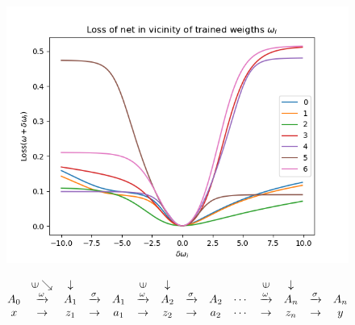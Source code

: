 \documentclass[12pt,a4paper]{article}
\newcommand{\vin}{\rotatebox[origin=c]{90}{$\in$}}
\begin{document}
\begin{figure}[H]
\center
\includegraphics[scale=0.5]{Images/LossInVicinityOfTrainedWeights.png}
\caption{}
\label{LossNearTrainedWeights}
\end{figure}

\newpage

\begin{equation}
\begin{array}{cccccccccccccc}
&
\vin\searrow & \downarrow &  &  & \vin 
 & \downarrow  &  &  &
 &
\vin & \downarrow &  &  \\

A_0 &
\xrightarrow{\omega} & A_1 & \xrightarrow{\sigma} & A_1 & 
\xrightarrow{\omega} & A_2 & \xrightarrow{\sigma} & A_2 &
\cdots &
\xrightarrow{\omega} & A_n & \xrightarrow{\sigma} & A_n \\

x &
\rightarrow & z_1 & \rightarrow & a_1 & 
\rightarrow & z_2 & \rightarrow & a_2 &
\cdots &
\rightarrow & z_n & \rightarrow & y
\end{array}
\end{equation}
\end{document}
